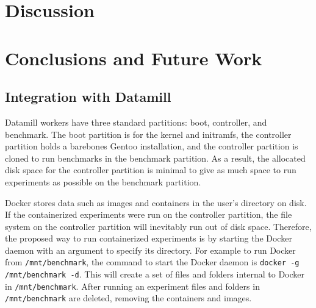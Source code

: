 \documentclass[11pt]{article}
\begin{document}
\section{Discussion}

\section{Conclusions and Future Work}

\subsection{Integration with Datamill}
Datamill workers have three standard partitions: boot, controller, and benchmark. The boot partition is for the kernel and initramfs, the controller partition holds a barebones Gentoo installation, and the controller partition is cloned to run benchmarks in the benchmark partition. As a result, the allocated disk space for the controller partition is minimal to give as much space to run experiments as possible on the benchmark partition. 

Docker stores data such as images and containers in the user’s directory on disk. If the containerized experiments were run on the controller partition, the file system on the controller partition will inevitably run out of disk space. Therefore, the proposed way to run containerized experiments is by starting the Docker daemon with an argument to specify its directory. For example to run Docker from \texttt{/mnt/benchmark}, the command to start the Docker daemon is \texttt{docker -g /mnt/benchmark -d}. This will create a set of files and folders internal to Docker in \texttt{/mnt/benchmark}. After running an experiment files and folders in \texttt{/mnt/benchmark} are deleted, removing the containers and images. 
\end{document}
